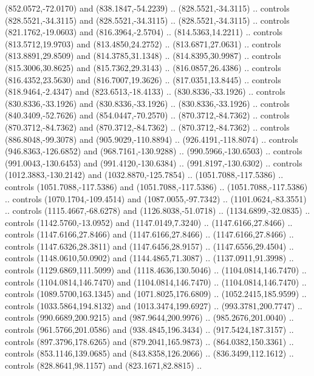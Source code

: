 \begin{scope}[shift={(-22.88722,-49.76189)}]
\begin{scope}[shift={(-739.46591,328.36782)}]
      (852.0572,-72.0170) and (838.1847,-54.2239) .. (828.5521,-34.3115) .. controls
      (828.5521,-34.3115) and (828.5521,-34.3115) .. (828.5521,-34.3115) .. controls
      (821.1762,-19.0603) and (816.3964,-2.5704) .. (814.5363,14.2211) .. controls
      (813.5712,19.9703) and (813.4850,24.2752) .. (813.6871,27.0631) .. controls
      (813.8891,29.8509) and (814.3785,31.1348) .. (814.8395,30.9987) .. controls
      (815.3006,30.8625) and (815.7362,29.3143) .. (816.0857,26.4386) .. controls
      (816.4352,23.5630) and (816.7007,19.3626) .. (817.0351,13.8445) .. controls
      (818.9464,-2.4347) and (823.6513,-18.4133) .. (830.8336,-33.1926) .. controls
      (830.8336,-33.1926) and (830.8336,-33.1926) .. (830.8336,-33.1926) .. controls
      (840.3409,-52.7626) and (854.0447,-70.2570) .. (870.3712,-84.7362) .. controls
      (870.3712,-84.7362) and (870.3712,-84.7362) .. (870.3712,-84.7362) .. controls
      (886.8048,-99.3078) and (905.9029,-110.8894) .. (926.4191,-118.8074) ..
      controls (946.8363,-126.6852) and (968.7161,-130.9288) .. (990.5966,-130.6503)
      .. controls (991.0043,-130.6453) and (991.4120,-130.6384) ..
      (991.8197,-130.6302) .. controls (1012.3883,-130.2142) and
      (1032.8870,-125.7854) .. (1051.7088,-117.5386) .. controls
      (1051.7088,-117.5386) and (1051.7088,-117.5386) .. (1051.7088,-117.5386) ..
      controls (1070.1704,-109.4514) and (1087.0055,-97.7342) ..
      (1101.0624,-83.3551) .. controls (1115.4667,-68.6278) and (1126.8038,-51.0718)
      .. (1134.6899,-32.0835) .. controls (1142.5760,-13.0952) and
      (1147.0149,7.3240) .. (1147.6166,27.8466) .. controls (1147.6166,27.8466) and
      (1147.6166,27.8466) .. (1147.6166,27.8466) .. controls (1147.6326,28.3811) and
      (1147.6456,28.9157) .. (1147.6556,29.4504) .. controls (1148.0610,50.0902) and
      (1144.4865,71.3087) .. (1137.0911,91.3998) .. controls (1129.6869,111.5099)
      and (1118.4636,130.5046) .. (1104.0814,146.7470) .. controls
      (1104.0814,146.7470) and (1104.0814,146.7470) .. (1104.0814,146.7470) ..
      controls (1089.5700,163.1345) and (1071.8025,176.6809) .. (1052.2415,185.9599)
      .. controls (1033.5864,194.8132) and (1013.3474,199.6927) ..
      (993.3781,200.7747) .. controls (990.6689,200.9215) and (987.9644,200.9976) ..
      (985.2676,201.0040) .. controls (961.5766,201.0586) and (938.4845,196.3434) ..
      (917.5424,187.3157) .. controls (897.3796,178.6265) and (879.2041,165.9873) ..
      (864.0382,150.3361) .. controls (853.1146,139.0685) and (843.8358,126.2066) ..
      (836.3499,112.1612) .. controls (828.8641,98.1157) and (823.1671,82.8815) ..

\end{scope}
\end{scope}
